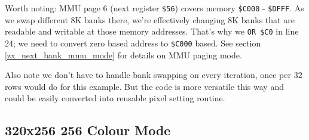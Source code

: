 \documentclass[12pt,twoside,openright,a4paper]{book}
\begin{document}
Worth noting: MMU page 6 (next register {\tt \$56}) covers memory {\tt \$C000} - {\tt \$DFFF}. As we swap different 8K banks there, we're effectively changing 8K banks that are readable and writable at those memory addresses. That's why we {\tt OR \$C0} in line 24; we need to convert zero based address to {\tt \$C000} based. See section \ref{zx_next_bank_mmu_mode} for details on MMU paging mode.

Also note we don't have to handle bank swapping on every iteration, once per 32 rows would do for this example. But the code is more versatile this way and could be easily converted into reusable pixel setting routine.


\pagebreak
\subsection{320x256 256 Colour Mode}
\end{document}
